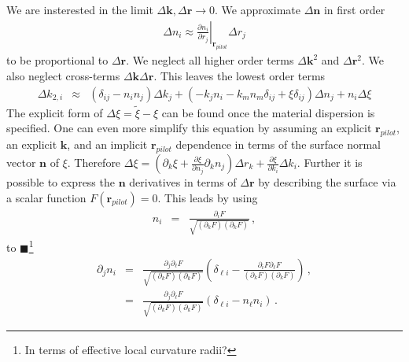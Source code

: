 \documentclass[12pt,a4paper,twoside,openright,BCOR10mm,headsepline,titlepage,abstracton,chapterprefix,final]{scrreprt}
\newcommand\Vector[1]{{\mathbf{#1}}}
\newcommand\wavenumber{k}
\newcommand\Wavevector{\Vector{\wavenumber}}
\newcommand{\remark}[1]{{\color{red}$\blacksquare$}\footnote{{\color{red}#1}}}
\begin{document}
We are insterested in the limit $\Delta\Wavevector, \Delta\Vector{r} \rightarrow 0$. We approximate $\Delta\Vector{n}$ in first order
\begin{eqnarray}
 \Delta n_i \approx \left. \frac{\partial n_i}{\partial r_j} \right|_{\Vector{r}_{pilot}} \Delta r_j
\end{eqnarray}
to be proportional to $\Delta\Vector{r}$. 
We neglect all higher order terms $\Delta\Wavevector^2$ and $\Delta\Vector{r}^2$.
We also neglect cross-terms $\Delta\Wavevector\Delta\Vector{r}$. 
This leaves the lowest order terms
\begin{eqnarray}
 \Delta \wavenumber_{2,i} &\approx& 
   \left( \delta_{ij}  - n_i n_j \right) \Delta\wavenumber_j
   +
   \left(
     - \wavenumber_j  n_i 
     - \wavenumber_m n_m \delta_{ij}  
     + \xi \delta_{ij}
   \right) \Delta n_j
   + n_i \Delta\xi 
\end{eqnarray}
The explicit form of $\Delta\xi = \tilde{\xi} - \xi$ can be found once the material dispersion is specified.
One can even more simplify this equation by assuming an explicit $\Vector{r}_{pilot}$, an explicit $\Wavevector$, and an implicit $\Vector{r}_{pilot}$ dependence in terms
of the surface normal vector $\Vector{n}$ of $\xi$. Therefore 
$\Delta \xi = \left(\partial_k \xi + \frac{\partial \xi}{\partial n_j} \partial_k n_j\right) \Delta r_k + \tfrac{\partial \xi}{\partial k_i} \Delta k_i$. 
Further it is possible to express the $\Vector{n}$ derivatives in terms of $\Delta \Vector{r}$ by describing the surface via
a scalar function $F(\Vector{r}_{pilot}) = 0$. This leads by using
\begin{eqnarray}
 n_i &=& \frac{\partial_i F}{\sqrt{(\partial_k F)(\partial_k F)}}\,,
\end{eqnarray}
to
\remark{In terms of effective local curvature radii?}
\begin{eqnarray}
  \partial_j n_i &=& \frac{\partial_j \partial_\ell F}{\sqrt{(\partial_k F)(\partial_k F)}} \left(\delta_{\ell i} - \frac{\partial_i F \partial_\ell F}{(\partial_k F)(\partial_k F)}\right)\,,\\
    &=& \frac{\partial_j \partial_\ell F}{\sqrt{(\partial_k F)(\partial_k F)}} \left(\delta_{\ell i} - n_\ell n_i\right)\,.\label{eq:nderivative}
\end{eqnarray}
\end{document}

